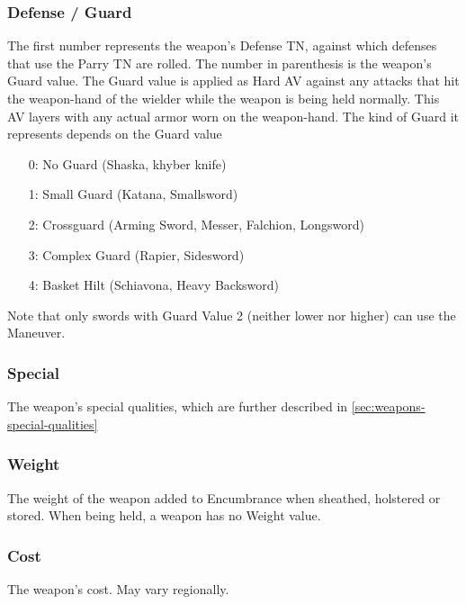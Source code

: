 \documentclass[oneside,11pt,english]{book}
\begin{document}
\subsubsection{Defense / Guard}
The first number represents the weapon’s Defense TN, against which defenses that
use the Parry TN are rolled. The number in parenthesis is the weapon’s Guard
value. The Guard value is applied as Hard AV against any attacks that hit the
weapon-hand of the wielder while the weapon is being held normally. This AV
layers with any actual armor worn on the weapon-hand. The kind of Guard it
represents depends on the Guard value
\begin{itemize}
\item [0:] No Guard (Shaska, khyber knife)
\item [1:] Small Guard (Katana, Smallsword)
\item [2:] Crossguard (Arming Sword, Messer, Falchion, Longsword)
\item [3:] Complex Guard (Rapier, Sidesword)
\item [4:] Basket Hilt (Schiavona, Heavy Backsword)
\end{itemize}
Note that only swords with Guard Value 2 (neither lower nor higher) can use the
 Maneuver.
\subsubsection{Special}
The weapon’s special qualities, which are further described in
\autoref{sec:weapons-special-qualities}
\subsubsection{Weight}
The weight of the weapon added to Encumbrance when sheathed, holstered or
stored. When being held, a weapon has no Weight value.
\subsubsection{Cost}
The weapon’s cost. May vary regionally.
\end{document}
